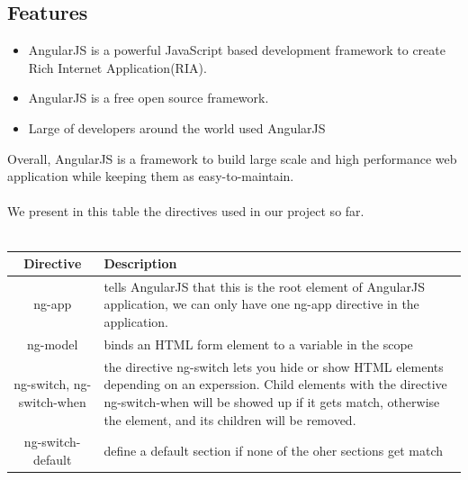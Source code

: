 	\subsection{Features}
	\begin{itemize}
		\item AngularJS is a powerful JavaScript based development framework to create Rich Internet Application(RIA).
		\item AngularJS is a free open source framework.
		\item Large of developers around the world used AngularJS
	\end{itemize}
		Overall, AngularJS is a framework to build large scale and high performance web application while keeping them as easy-to-maintain.
		\\
		\\
		We present in this table the directives used in our project so far.
		\\
		\\
		\begin{table}
				\centering
			\begin{tabular}{|c|p{10cm}|}	
				\hline
				\textbf{Directive} & \textbf{Description }\\
				\hline
				ng-app & tells AngularJS that this is the root element of AngularJS application, we can only have one ng-app directive in the application.
				\\
				ng-model & binds an HTML form element to a variable in the scope  \\
				ng-switch, ng-switch-when & the directive ng-switch lets you hide or show HTML elements depending on an experssion. Child elements with the directive ng-switch-when will be showed up if it gets match, otherwise the element, and its children will be removed.
				\\
				ng-switch-default & define a default section if none of the oher sections get match\\ 
					
				\hline
			\end{tabular} 
		\end{table}
	
